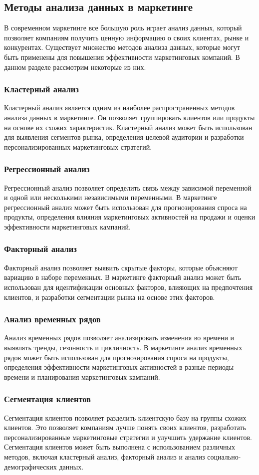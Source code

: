 \documentclass{article}
\begin{document}
\subsection{Методы анализа данных в маркетинге}
В современном маркетинге все большую роль играет анализ данных, который позволяет компаниям получить ценную информацию о своих клиентах, рынке и конкурентах. Существует множество методов анализа данных, которые могут быть применены для повышения эффективности маркетинговых компаний. В данном разделе рассмотрим некоторые из них.
\subsubsection{Кластерный анализ}
Кластерный анализ является одним из наиболее распространенных методов анализа данных в маркетинге. Он позволяет группировать клиентов или продукты на основе их схожих характеристик. Кластерный анализ может быть использован для выявления сегментов рынка, определения целевой аудитории и разработки персонализированных маркетинговых стратегий.
\subsubsection{Регрессионный анализ}
Регрессионный анализ позволяет определить связь между зависимой переменной и одной или несколькими независимыми переменными. В маркетинге регрессионный анализ может быть использован для прогнозирования спроса на продукты, определения влияния маркетинговых активностей на продажи и оценки эффективности маркетинговых кампаний.
\subsubsection{Факторный анализ}
Факторный анализ позволяет выявить скрытые факторы, которые объясняют вариацию в наборе переменных. В маркетинге факторный анализ может быть использован для идентификации основных факторов, влияющих на предпочтения клиентов, и разработки сегментации рынка на основе этих факторов.
\subsubsection{Анализ временных рядов}
Анализ временных рядов позволяет анализировать изменения во времени и выявлять тренды, сезонность и цикличность. В маркетинге анализ временных рядов может быть использован для прогнозирования спроса на продукты, определения эффективности маркетинговых активностей в разные периоды времени и планирования маркетинговых кампаний.
\subsubsection{Сегментация клиентов}
Сегментация клиентов позволяет разделить клиентскую базу на группы схожих клиентов. Это позволяет компаниям лучше понять своих клиентов, разработать персонализированные маркетинговые стратегии и улучшить удержание клиентов. Сегментация клиентов может быть выполнена с использованием различных методов, включая кластерный анализ, факторный анализ и анализ социально-демографических данных.
\end{document}
